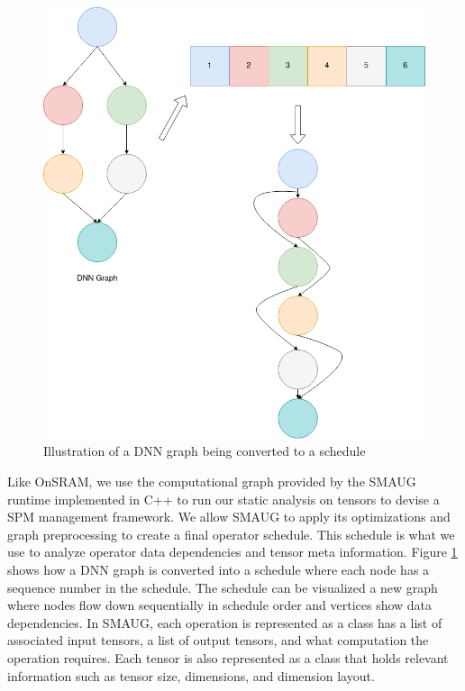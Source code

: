 \begin{figure}[thb!]
\centering
\includegraphics[scale=0.6]{Figures/graph_to_schedule.png}
\decoRule
\caption[Computational Graph to Schedule Conversion]{Illustration of a DNN graph being converted to a schedule}
\label{fig:graphToSchedule}
\end{figure}

Like OnSRAM, we use the computational graph provided by the SMAUG runtime
implemented in C++ to run our static analysis on tensors to devise a SPM
management framework. We allow SMAUG to apply its optimizations and graph
preprocessing to create a final operator schedule. This schedule is what we use
to analyze operator data dependencies and tensor meta information.  Figure
\ref{fig:graphToSchedule} shows how a DNN graph is converted into a schedule
where each node has a sequence number in the schedule. The schedule can be
visualized a new graph where nodes flow down sequentially in schedule order and
vertices show data dependencies. In SMAUG, each operation is represented as a
class has a list of associated input tensors, a list of output tensors, and
what computation the operation requires.  Each tensor is also represented as a
class that holds relevant information such as tensor size, dimensions, and
dimension layout.


